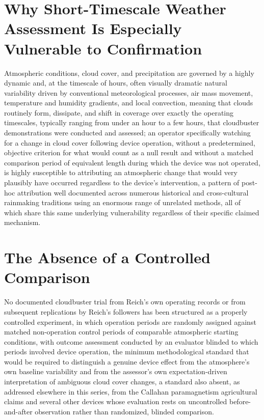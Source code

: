 \documentclass[11pt]{article}
\begin{document}
\section{Why Short-Timescale Weather Assessment Is Especially Vulnerable to Confirmation}

Atmospheric conditions, cloud cover, and precipitation are governed by a highly dynamic and, at the timescale of hours, often visually dramatic natural variability driven by conventional meteorological processes, air mass movement, temperature and humidity gradients, and local convection, meaning that clouds routinely form, dissipate, and shift in coverage over exactly the operating timescales, typically ranging from under an hour to a few hours, that cloudbuster demonstrations were conducted and assessed; an operator specifically watching for a change in cloud cover following device operation, without a predetermined, objective criterion for what would count as a null result and without a matched comparison period of equivalent length during which the device was not operated, is highly susceptible to attributing an atmospheric change that would very plausibly have occurred regardless to the device's intervention, a pattern of post-hoc attribution well documented across numerous historical and cross-cultural rainmaking traditions using an enormous range of unrelated methods, all of which share this same underlying vulnerability regardless of their specific claimed mechanism.

\section{The Absence of a Controlled Comparison}

No documented cloudbuster trial from Reich's own operating records or from subsequent replications by Reich's followers has been structured as a properly controlled experiment, in which operation periods are randomly assigned against matched non-operation control periods of comparable atmospheric starting conditions, with outcome assessment conducted by an evaluator blinded to which periods involved device operation, the minimum methodological standard that would be required to distinguish a genuine device effect from the atmosphere's own baseline variability and from the assessor's own expectation-driven interpretation of ambiguous cloud cover changes, a standard also absent, as addressed elsewhere in this series, from the Callahan paramagnetism agricultural claims and several other devices whose evaluation rests on uncontrolled before-and-after observation rather than randomized, blinded comparison.
\end{document}
